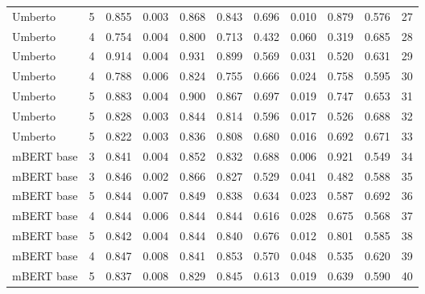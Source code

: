\begin{tabular}{lrrrrrrrrrr}
           Umberto &      5 &   0.855 &          0.003 &    0.868 &     0.843 &    0.696 &           0.010 &     0.879 &      0.576 &  27 \\
           Umberto &      4 &   0.754 &          0.004 &    0.800 &     0.713 &    0.432 &           0.060 &     0.319 &      0.685 &  28 \\
           Umberto &      4 &   0.914 &          0.004 &    0.931 &     0.899 &    0.569 &           0.031 &     0.520 &      0.631 &  29 \\
           Umberto &      4 &   0.788 &          0.006 &    0.824 &     0.755 &    0.666 &           0.024 &     0.758 &      0.595 &  30 \\
           Umberto &      5 &   0.883 &          0.004 &    0.900 &     0.867 &    0.697 &           0.019 &     0.747 &      0.653 &  31 \\
           Umberto &      5 &   0.828 &          0.003 &    0.844 &     0.814 &    0.596 &           0.017 &     0.526 &      0.688 &  32 \\
           Umberto &      5 &   0.822 &          0.003 &    0.836 &     0.808 &    0.680 &           0.016 &     0.692 &      0.671 &  33 \\
        mBERT base &      3 &   0.841 &          0.004 &    0.852 &     0.832 &    0.688 &           0.006 &     0.921 &      0.549 &  34 \\
        mBERT base &      3 &   0.846 &          0.002 &    0.866 &     0.827 &    0.529 &           0.041 &     0.482 &      0.588 &  35 \\
        mBERT base &      5 &   0.844 &          0.007 &    0.849 &     0.838 &    0.634 &           0.023 &     0.587 &      0.692 &  36 \\
        mBERT base &      4 &   0.844 &          0.006 &    0.844 &     0.844 &    0.616 &           0.028 &     0.675 &      0.568 &  37 \\
        mBERT base &      5 &   0.842 &          0.004 &    0.844 &     0.840 &    0.676 &           0.012 &     0.801 &      0.585 &  38 \\
        mBERT base &      4 &   0.847 &          0.008 &    0.841 &     0.853 &    0.570 &           0.048 &     0.535 &      0.620 &  39 \\
        mBERT base &      5 &   0.837 &          0.008 &    0.829 &     0.845 &    0.613 &           0.019 &     0.639 &      0.590 &  40 \\
\bottomrule
\end{tabular}
